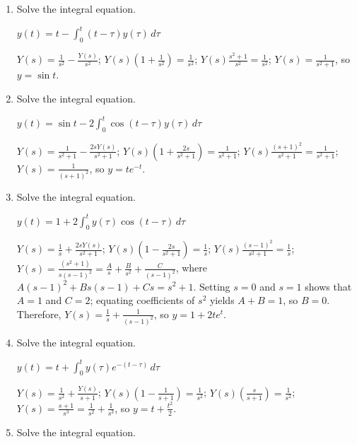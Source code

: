 \documentclass{ximera}
\begin{document}
\begin{problem}\label{exer:8.6.4}

\begin{enumerate}
\item Solve the integral equation.

$y(t)=t-\int_0^t (t-\tau)
y(\tau)\,d\tau$

\begin{solution}
$Y(s)=\frac{1}{s^2}-\frac{Y(s)}{s^2}$;
$Y(s)\left(1+\frac{1}{s^2}\right)=\frac{1}{s^2}$; $Y(s)\frac{s^2+1}{s^2}=\frac{1}{s^2}$; $Y(s)=\frac{1}{s^2+1}$, so $y=\sin t$.
\end{solution}

\item Solve the integral equation.

$y(t)=\sin t-2
\int_0^t\cos (t-\tau) y (\tau)\,d\tau$

\begin{solution}
$Y(s)=\frac{1}{s^2+1}-\frac{2sY(s)}{s^2+1}$;
$Y(s)\left(1+\frac{2s}{s^2+1}\right)=\frac{1}{s^2+1}$; $Y(s)\frac{(s+1)^2}{s^2+1}=\frac{1}{s^2+1}$; $Y(s)=\frac{1}{(s+1)^2}$, so
$y=te^{-t}$.
\end{solution}

\item Solve the integral equation.

$y(t)=1+2
\int_0^ty(\tau)\cos(t-\tau)\,d\tau$

\begin{solution}
$Y(s)=\frac{1}{s}+\frac{2sY(s)}{s^2+1}$;
$Y(s)\left(1-\frac{2s}{s^2+1}\right)=\frac{1}{s}$; $Y(s)\frac{(s-1)^2}{s^2+1}=\frac{1}{s}$;
$Y(s)=\frac{(s^2+1)}{s(s-1)^2}=\frac{A}{s}+\frac{B}{s^2}
+\frac{C}{(s-1)^2}$, where $A(s-1)^2+Bs(s-1)+Cs=s^2+1$.
Setting $s=0$ and $s=1$ shows that $A=1$ and $C=2$; equating
coefficients of $s^2$ yields $A+B=1$, so $B=0$.  Therefore,
$Y(s)=\frac{1}{s}
+\frac{1}{(s-1)^2}$, so $y=1+2te^t$.
\end{solution}

\item Solve the integral equation.

$y(t)=t+\int_0^t
y(\tau)e^{-(t-\tau)}\,d\tau$

\begin{solution}
$Y(s)=\frac{1}{s^2}+\frac{Y(s)}{s+1}$;
$Y(s)\left(1-\frac{1}{s+1}\right)=\frac{1}{s^2}$;
$Y(s)\left(\frac{s}{s+1}\right)=\frac{1}{s^2}$;
$Y(s)=\frac{s+1}{s^3}
=\frac{1}{s^2}+\frac{1}{s^3}$, so
$y=t+\frac{t^2}{2}$.
\end{solution}

\item Solve the integral equation. 


\end{enumerate}
\end{problem}
\end{document}
